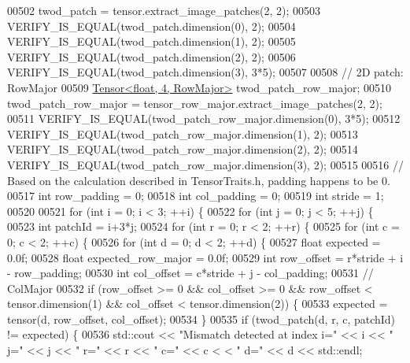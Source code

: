 \begin{DoxyCode}
00502   twod\_patch = tensor.extract\_image\_patches(2, 2);
00503   VERIFY\_IS\_EQUAL(twod\_patch.dimension(0), 2);
00504   VERIFY\_IS\_EQUAL(twod\_patch.dimension(1), 2);
00505   VERIFY\_IS\_EQUAL(twod\_patch.dimension(2), 2);
00506   VERIFY\_IS\_EQUAL(twod\_patch.dimension(3), 3*5);
00507 
00508   \textcolor{comment}{// 2D patch: RowMajor}
00509   \hyperlink{class_eigen_1_1_tensor}{Tensor<float, 4, RowMajor>} twod\_patch\_row\_major;
00510   twod\_patch\_row\_major = tensor\_row\_major.extract\_image\_patches(2, 2);
00511   VERIFY\_IS\_EQUAL(twod\_patch\_row\_major.dimension(0), 3*5);
00512   VERIFY\_IS\_EQUAL(twod\_patch\_row\_major.dimension(1), 2);
00513   VERIFY\_IS\_EQUAL(twod\_patch\_row\_major.dimension(2), 2);
00514   VERIFY\_IS\_EQUAL(twod\_patch\_row\_major.dimension(3), 2);
00515 
00516   \textcolor{comment}{// Based on the calculation described in TensorTraits.h, padding happens to be 0.}
00517   \textcolor{keywordtype}{int} row\_padding = 0;
00518   \textcolor{keywordtype}{int} col\_padding = 0;
00519   \textcolor{keywordtype}{int} stride = 1;
00520 
00521   \textcolor{keywordflow}{for} (\textcolor{keywordtype}{int} i = 0; i < 3; ++i) \{
00522     \textcolor{keywordflow}{for} (\textcolor{keywordtype}{int} j = 0; j < 5; ++j) \{
00523       \textcolor{keywordtype}{int} patchId = i+3*j;
00524       \textcolor{keywordflow}{for} (\textcolor{keywordtype}{int} r = 0; r < 2; ++r) \{
00525         \textcolor{keywordflow}{for} (\textcolor{keywordtype}{int} c = 0; c < 2; ++c) \{
00526           \textcolor{keywordflow}{for} (\textcolor{keywordtype}{int} d = 0; d < 2; ++d) \{
00527             \textcolor{keywordtype}{float} expected = 0.0f;
00528             \textcolor{keywordtype}{float} expected\_row\_major = 0.0f;
00529             \textcolor{keywordtype}{int} row\_offset = r*stride + i - row\_padding;
00530             \textcolor{keywordtype}{int} col\_offset = c*stride + j - col\_padding;
00531             \textcolor{comment}{// ColMajor}
00532             \textcolor{keywordflow}{if} (row\_offset >= 0 && col\_offset >= 0 && row\_offset < tensor.dimension(1) && col\_offset < 
      tensor.dimension(2)) \{
00533               expected = tensor(d, row\_offset, col\_offset);
00534             \}
00535             \textcolor{keywordflow}{if} (twod\_patch(d, r, c, patchId) != expected) \{
00536               std::cout << \textcolor{stringliteral}{"Mismatch detected at index i="} << i << \textcolor{stringliteral}{" j="} << j << \textcolor{stringliteral}{" r="} << r << \textcolor{stringliteral}{" c="} << c <
      < \textcolor{stringliteral}{" d="} << d << std::endl;

\end{DoxyCode}
